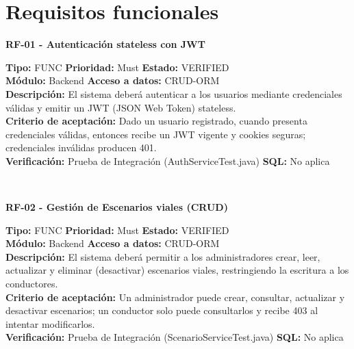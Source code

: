\documentclass[11pt,a4paper]{article}
\begin{document}
\newpage
\section{Requisitos funcionales}

\newenvironment{requisito}[1]{
    \vspace{0.5cm}
    \noindent\tabularx{\textwidth}{@{}|X|@{}}
    \hline
     \textbf{#1} \\
    \hline
}{
    \\ \hline
    \endtabularx
}

\begin{requisito}{RF-01 - Autenticación stateless con JWT}
    \textbf{Tipo:} FUNC \quad \textbf{Prioridad:} Must \quad \textbf{Estado:} VERIFIED \\[0.2cm]
    \textbf{Módulo:} Backend \quad \textbf{Acceso a datos:} CRUD-ORM \\[0.2cm]
    \textbf{Descripción:} El sistema deberá autenticar a los usuarios mediante credenciales válidas y emitir un JWT (JSON Web Token) stateless. \\[0.2cm]
    \textbf{Criterio de aceptación:} Dado un usuario registrado, cuando presenta credenciales válidas, entonces recibe un JWT vigente y cookies seguras; credenciales inválidas producen 401. \\[0.2cm]
    \textbf{Verificación:} Prueba de Integración (AuthServiceTest.java) \quad \textbf{SQL:} No aplica
\end{requisito}

\begin{requisito}{RF-02 - Gestión de Escenarios viales (CRUD)}
    \textbf{Tipo:} FUNC \quad \textbf{Prioridad:} Must \quad \textbf{Estado:} VERIFIED \\[0.2cm]
    \textbf{Módulo:} Backend \quad \textbf{Acceso a datos:} CRUD-ORM \\[0.2cm]
    \textbf{Descripción:} El sistema deberá permitir a los administradores crear, leer, actualizar y eliminar (desactivar) escenarios viales, restringiendo la escritura a los conductores. \\[0.2cm]
    \textbf{Criterio de aceptación:} Un administrador puede crear, consultar, actualizar y desactivar escenarios; un conductor solo puede consultarlos y recibe 403 al intentar modificarlos. \\[0.2cm]
    \textbf{Verificación:} Prueba de Integración (ScenarioServiceTest.java) \quad \textbf{SQL:} No aplica
\end{requisito}
\end{document}

